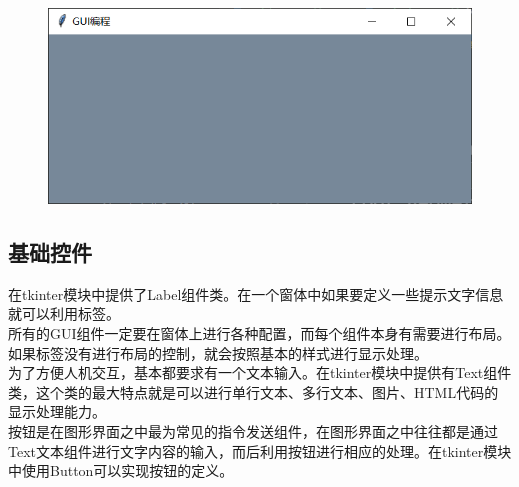 \begin{tcolorbox}
	\begin{figure}[H]
		\centering
		\includegraphics[]{img/C13/13-1/1.png}
	\end{figure}
\end{tcolorbox}

\vspace{0.5cm}

\subsection{基础控件}

在tkinter模块中提供了Label组件类。在一个窗体中如果要定义一些提示文字信息就可以利用标签。\\

所有的GUI组件一定要在窗体上进行各种配置，而每个组件本身有需要进行布局。如果标签没有进行布局的控制，就会按照基本的样式进行显示处理。\\

为了方便人机交互，基本都要求有一个文本输入。在tkinter模块中提供有Text组件类，这个类的最大特点就是可以进行单行文本、多行文本、图片、HTML代码的显示处理能力。\\

按钮是在图形界面之中最为常见的指令发送组件，在图形界面之中往往都是通过Text文本组件进行文字内容的输入，而后利用按钮进行相应的处理。在tkinter模块中使用Button可以实现按钮的定义。\\


